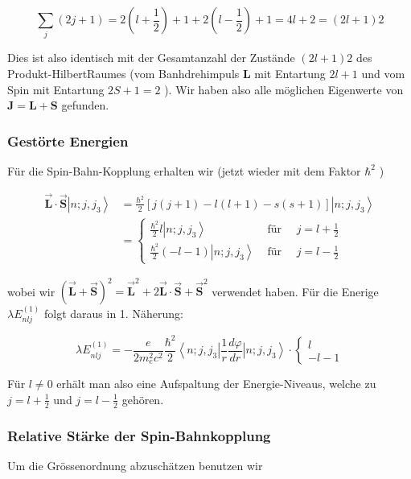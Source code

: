 \documentclass[10pt, letterpaper]{article}
\begin{document}
$$
\sum_{j}(2 j+1)=2\left(l+\frac{1}{2}\right)+1+2\left(l-\frac{1}{2}\right)+1=4 l+2=(2 l+1) 2
$$

Dies ist also identisch mit der Gesamtanzahl der Zustände $(2 l+1) 2$ des Produkt-HilbertRaumes (vom Banhdrehimpuls $\mathbf{L}$ mit Entartung $2 l+1$ und vom Spin mit Entartung $2 S+1=2$ ). Wir haben also alle möglichen Eigenwerte von $\mathbf{J}=\mathbf{L}+\mathbf{S}$ gefunden.

\subsubsection*{Gestörte Energien}
Für die Spin-Bahn-Kopplung erhalten wir (jetzt wieder mit dem Faktor $\hbar^{2}$ )

$$
\begin{aligned}
\overrightarrow{\mathbf{L}} \cdot \overrightarrow{\mathbf{S}}\left|n ; j, j_{3}\right\rangle & =\frac{\hbar^{2}}{2}[j(j+1)-l(l+1)-s(s+1)]\left|n ; j, j_{3}\right\rangle \\
& =\left\{\begin{array}{rr}
\frac{\hbar^{2}}{2} l\left|n ; j, j_{3}\right\rangle & \text { für } \quad j=l+\frac{1}{2} \\
\frac{\hbar^{2}}{2}(-l-1)\left|n ; j, j_{3}\right\rangle & \text { für } \quad j=l-\frac{1}{2}
\end{array}\right.
\end{aligned}
$$

wobei wir $(\overrightarrow{\mathbf{L}}+\overrightarrow{\mathbf{S}})^{2}=\overrightarrow{\mathbf{L}}^{2}+2 \overrightarrow{\mathbf{L}} \cdot \overrightarrow{\mathbf{S}}+\overrightarrow{\mathbf{S}}^{2}$ verwendet haben. Für die Enerige $\lambda E_{n l j}^{(1)}$ folgt daraus in 1. Näherung:

$$
\lambda E_{n l j}^{(1)}=-\frac{e}{2 m_{e}^{2} c^{2}} \frac{\hbar^{2}}{2}\left\langle n ; j, j_{3}\right| \frac{1}{r} \frac{d \varphi}{d r}\left|n ; j, j_{3}\right\rangle \cdot\left\{\begin{array}{c}
l \\
-l-1
\end{array}\right.
$$

Für $l \neq 0$ erhält man also eine Aufspaltung der Energie-Niveaus, welche zu $j=l+\frac{1}{2}$ und $j=l-\frac{1}{2}$ gehören.

\subsubsection*{Relative Stärke der Spin-Bahnkopplung}
Um die Grössenordnung abzuschätzen benutzen wir
\end{document}
